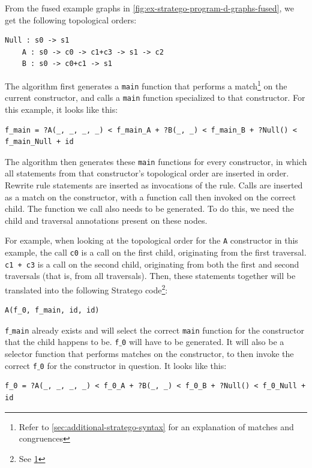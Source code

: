 From the fused example graphs in \autoref{fig:ex-stratego-program-d-graphs-fused}, we get the following topological orders:
\begin{lstlisting}[style = mystyle_fused_stratego]
    Null : s0 -> s1
    A : s0 -> c0 -> c1+c3 -> s1 -> c2
    B : s0 -> c0+c1 -> s1
\end{lstlisting}

The algorithm first generates a \texttt{main} function that performs a match\footnote{\label{note-match-cong}Refer to \autoref{sec:additional-stratego-syntax} for an explanation of matches and congruences} on the current constructor, and calls a \texttt{main} function specialized to that constructor. For this example, it looks like this:
\begin{lstlisting}[style = mystyle_fused_stratego]
    f_main = ?A(_, _, _, _) < f_main_A + ?B(_, _) < f_main_B + ?Null() < f_main_Null + id
\end{lstlisting}

The algorithm then generates these \texttt{main} functions for every constructor, in which all statements from that constructor's topological order are inserted in order. Rewrite rule statements are inserted as invocations of the rule. Calls are inserted as a match on the constructor, with a function call then invoked on the correct child. The function we call also needs to be generated. To do this, we need the child and traversal annotations present on these nodes.

For example, when looking at the topological order for the \texttt{A} constructor in this example, the call \texttt{c0} is a call on the first child, originating from the first traversal. \texttt{c1 + c3} is a call on the second child, originating from both the first and second traversals (that is, from all traversals). Then, these statements together will be translated into the following Stratego code\footnote{See \ref{note-match-cong}}:
\begin{lstlisting}[style = mystyle_fused_stratego]
    A(f_0, f_main, id, id)
\end{lstlisting}

\texttt{f$\_$main} already exists and will select the correct \texttt{main} function for the constructor that the child happens to be. \texttt{f$\_$0} will have to be generated. It will also be a selector function that performs matches on the constructor, to then invoke the correct \texttt{f$\_$0} for the constructor in question. It looks like this:

\begin{lstlisting}[style = mystyle_fused_stratego]
    f_0 = ?A(_, _, _, _) < f_0_A + ?B(_, _) < f_0_B + ?Null() < f_0_Null + id
\end{lstlisting}


